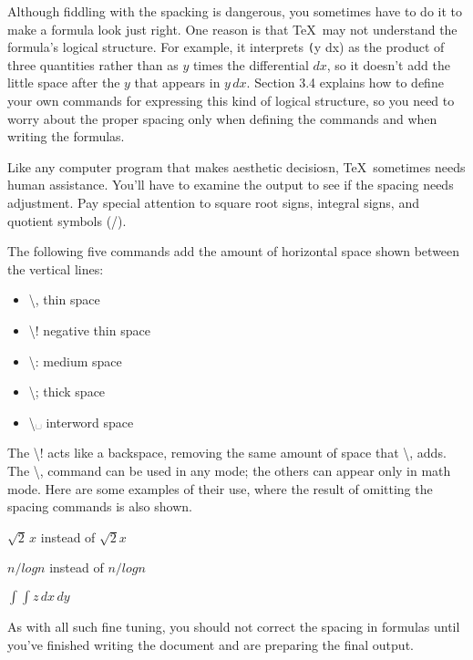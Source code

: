 \documentclass[twocolumn]{book}        %
\begin{document}
Although fiddling with the spacking is dangerous, you sometimes have to do it to make a formula look 
just right. One reason is that \TeX\ may not understand the formula's logical structure. For example,
it interprets \texttt(y dx) as the product of three quantities rather than as $y$ times the differential $dx$,
so it doesn't add the little space after the $y$ that appears in $y\,dx$. Section 3.4 explains how to define
your own commands for expressing this kind of logical structure, so you need to worry about the proper spacing 
only when defining the commands and when writing the formulas.

Like any computer program that makes aesthetic decisiosn, \TeX\ sometimes needs human assistance. You'll 
have to examine the output to see if the spacing needs adjustment. Pay special attention to square root signs,
integral signs, and quotient symbols (/).

The following five commands add the amount of horizontal space shown between the vertical lines:

\begin{itemize}
    \item \textbackslash , thin space 
    \item \textbackslash ! negative thin space
    \item \textbackslash : medium space 
    \item \textbackslash ; thick space 
    \item \textbackslash ␣ interword space
\end{itemize}

The \textbackslash ! acts like a backspace, removing the same amount of space that \textbackslash , adds.
The \textbackslash , command can be used in any mode; the others can appear only in math mode.
Here are some examples of their use, where the result of omitting the spacing commands is also shown.

\( \sqrt{2} \, x \) instead of \( \sqrt{2}x \)

\( n / \! log n \) instead of \( n / log n \) 

\( \int\!\!\int z\,dx\,dy \)

As with all such fine tuning, you should not correct the spacing in formulas until you've finished 
writing the document and are preparing the final output.
\end{document}
